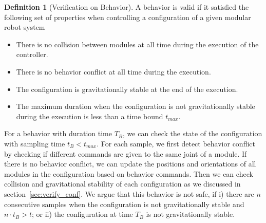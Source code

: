 \documentclass[conference]{IEEEtran}
\theoremstyle{definition}
\newtheorem{definition}{Definition}[section]
\newcommand{\TODO}[1]{ {\bf \textcolor{red}{TODO:} #1 }}
\begin{document}
\begin{definition}[Verification on Behavior]
A behavior is valid if it satisfied the following set of properties when controlling a configuration of a given modular robot system
\begin{itemize}
\item There is no collision between modules at all time during the execution of the controller.
\item There is no behavior conflict at all time during the execution.
\item The configuration is gravitationally stable at the end of the execution.
\item The maximum duration when the configuration is not gravitationally stable during the execution is less than a time bound $t_{max}$.
\end{itemize}
\end{definition}
For a behavior with duration time $T_B$, we can check the state of the configuration with sampling time $t_B<t_{max}$. For each sample, we first detect behavior conflict by checking if different commands are given to the same joint of a module. If there is no behavior conflict, we can update the positions and orientations of all modules in the configuration based on behavior commands. Then we can check collision and gravitational stability of each configuration as we discussed in section~\ref{sec:verify_conf}. We argue that this behavior is not safe, if i) there are $n$ consecutive samples when the configuration is not gravitationally stable and $n\cdot t_B > t$; or ii) the configuration at time $T_B$ is not gravitationally stable.
\end{document}
